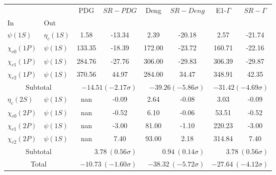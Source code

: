 \begin{tabular}{|l|l|c|c|c|c|c|c|}%
\hline%
&&PDG&$SR-PDG$&Deng&$SR-Deng$&E1-$\Gamma$&$SR-\Gamma$\\%
In&Out&&&&&&\\%
\hline%
$\psi(1S)$&$\eta_{c}(1S)$&1.58&-13.34&2.39&-20.18&2.57&-21.74\\%
$\chi_{c0}(1P)$&$\psi(1S)$&133.35&-18.39&172.00&-23.72&160.71&-22.16\\%
$\chi_{c1}(1P)$&$\psi(1S)$&284.76&-27.76&306.00&-29.83&306.39&-29.87\\%
$\chi_{c2}(1P)$&$\psi(1S)$&370.56&44.97&284.00&34.47&348.91&42.35\\%
\hline%
\hline%
\multicolumn{2}{|c|}{Subtotal}&\multicolumn{2}{|r|}{$-14.51 (-2.17\sigma)$}&\multicolumn{2}{|r|}{$-39.26 (-5.86\sigma)$}&\multicolumn{2}{|r|}{$-31.42 (-4.69\sigma)$}\\%
\hline%
\hline%
$\eta_{c}(2S)$&$\psi(1S)$&nan&-0.09&2.64&-0.08&3.03&-0.09\\%
$\chi_{c0}(2P)$&$\psi(1S)$&nan&-0.52&6.10&-0.06&53.51&-0.52\\%
$\chi_{c1}(2P)$&$\psi(1S)$&nan&-3.00&81.00&-1.10&220.23&-3.00\\%
$\chi_{c2}(2P)$&$\psi(1S)$&nan&7.40&93.00&2.18&314.84&7.40\\%
\hline%
\hline%
\multicolumn{2}{|c|}{Subtotal}&\multicolumn{2}{|r|}{$3.78~(0.56\sigma)$}&\multicolumn{2}{|r|}{$0.94~(0.14\sigma)$}&\multicolumn{2}{|r|}{$3.78~(0.56\sigma)$}\\%
\hline%
\hline%
\multicolumn{2}{|c|}{Total}&\multicolumn{2}{|r|}{$-10.73~(-1.60\sigma)$}&\multicolumn{2}{|r|}{$-38.32~(-5.72\sigma)$}&\multicolumn{2}{|r|}{$-27.64~(-4.12\sigma)$}\\%
\hline%
\end{tabular}